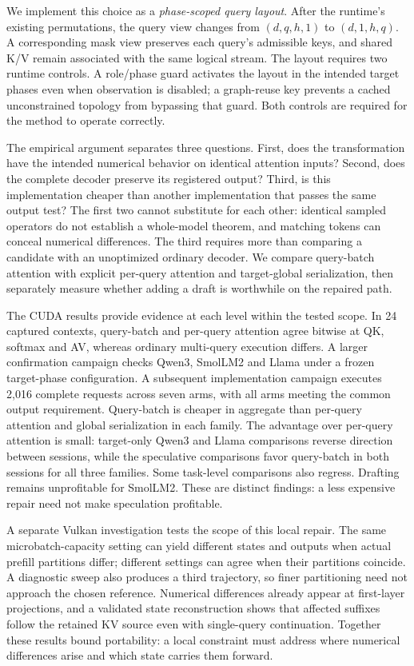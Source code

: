 We implement this choice as a \emph{phase-scoped query layout}. After the runtime's existing permutations, the query view changes from $(d,q,h, 1)$ to $(d, 1,h,q)$. A corresponding mask view preserves each query's admissible keys, and shared K/V remain associated with the same logical stream. The layout requires two runtime controls. A role/phase guard activates the layout in the intended target phases even when observation is disabled; a graph-reuse key prevents a cached unconstrained topology from bypassing that guard. Both controls are required for the method to operate correctly.

The empirical argument separates three questions. First, does the transformation have the intended numerical behavior on identical attention inputs? Second, does the complete decoder preserve its registered output? Third, is this implementation cheaper than another implementation that passes the same output test? The first two cannot substitute for each other: identical sampled operators do not establish a whole-model theorem, and matching tokens can conceal numerical differences. The third requires more than comparing a candidate with an unoptimized ordinary decoder. We compare query-batch attention with explicit per-query attention and target-global serialization, then separately measure whether adding a draft is worthwhile on the repaired path.

The CUDA results provide evidence at each level within the tested scope. In 24 captured contexts, query-batch and per-query attention agree bitwise at QK, softmax and AV, whereas ordinary multi-query execution differs. A larger confirmation campaign checks Qwen3, SmolLM2 and Llama under a frozen target-phase configuration. A subsequent implementation campaign executes 2,016 complete requests across seven arms, with all arms meeting the common output requirement. Query-batch is cheaper in aggregate than per-query attention and global serialization in each family. The advantage over per-query attention is small: target-only Qwen3 and Llama comparisons reverse direction between sessions, while the speculative comparisons favor query-batch in both sessions for all three families. Some task-level comparisons also regress. Drafting remains unprofitable for SmolLM2. These are distinct findings: a less expensive repair need not make speculation profitable.

A separate Vulkan investigation tests the scope of this local repair. The same microbatch-capacity setting can yield different states and outputs when actual prefill partitions differ; different settings can agree when their partitions coincide. A diagnostic sweep also produces a third trajectory, so finer partitioning need not approach the chosen reference. Numerical differences already appear at first-layer projections, and a validated state reconstruction shows that affected suffixes follow the retained KV source even with single-query continuation. Together these results bound portability: a local constraint must address where numerical differences arise and which state carries them forward.

